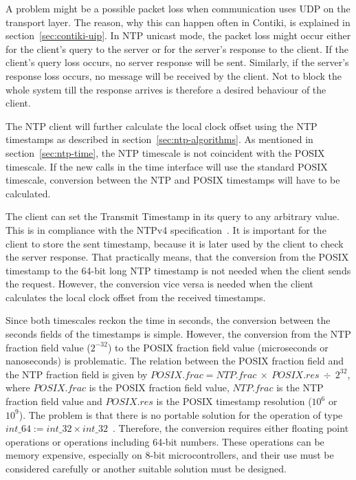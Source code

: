 A problem might be a possible packet loss when communication uses UDP on the transport layer.
The reason, why this can happen often in Contiki, is explained in section~\ref{sec:contiki-uip}.
In NTP unicast mode, the packet loss might occur either for the client's query to the server
or for the server's response to the client.
If the client's query loss occurs, no server response will be sent.
Similarly, if the server's response loss occurs, no message will be received by the client.
Not to block the whole system till the response arrives
is therefore a desired behaviour of the client.

The NTP client will further calculate the local clock offset using the NTP timestamps
as described in section~\ref{sec:ntp-algorithms}.
As mentioned in section~\ref{sec:ntp-time}, the NTP timescale is not
coincident with the POSIX timescale.
If the new calls in the time interface will use the standard POSIX timescale,
conversion between the NTP and POSIX timestamps will have to be calculated.

The client can set the Transmit Timestamp in its query to any arbitrary value.
This is in compliance with the NTPv4 specification~\cite{rfc5905}.
It is important for the client to store the sent timestamp,
because it is later used by the client to check the server response.
That practically means, that the conversion from the POSIX timestamp to the 64-bit long NTP timestamp
is not needed when the client sends the request.
However, the conversion vice versa is needed when the client calculates
the local clock offset from the received timestamps.

Since both timescales reckon the time in seconds, the conversion between
the seconds fields of the timestamps is simple.
However, the conversion from the NTP fraction field value ($2^{-32}$)
to the POSIX fraction field value (microseconds or nanoseconds) is problematic.
The relation between the POSIX fraction field and the NTP fraction field
is given by $POSIX.frac = NTP.frac~\times~POSIX.res~\div~2^{32}$,
where $POSIX.frac$ is the POSIX fraction field value,
$NTP.frac$ is the NTP fraction field value and
$POSIX.res$ is the POSIX timestamp resolution ($10^6$ or $10^9$).
The problem is that there is no portable solution for the operation of type $int\_64 := int\_32 \times int\_32$~\cite{c99}.
Therefore, the conversion requires either floating point operations or operations including 64-bit numbers.
These operations can be memory expensive, especially on 8-bit microcontrollers,
and their use must be considered carefully or another suitable solution must be designed.
